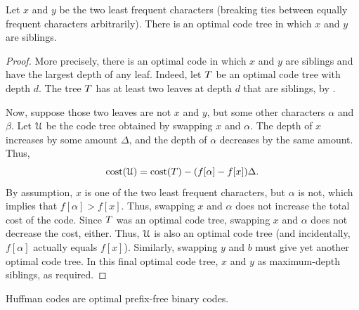 \begin{lemma}
    Let $x$ and $y$ be the two least frequent characters (breaking
    ties between equally frequent characters arbitrarily). There is an
    optimal code tree in which $x$ and $y$ are siblings.
\end{lemma}

\begin{proof}
    More precisely, there is an optimal code in which $x$ and $y$ are
    siblings and have the largest depth of any leaf.  Indeed, let
    $T$ be an optimal code tree with depth $d$. The tree $T$
    has at least two leaves at depth $d$ that are siblings, by
    .

    Now, suppose those two leaves are not $x$ and $y$, but some other
    characters $\alpha$ and $\beta$.  Let $\EuScript{U}$ be the code tree
    obtained by swapping $x$ and $\alpha$. The depth of $x$ increases
    by some amount $\Delta$, and the depth of $\alpha$ decreases by
    the same amount. Thus,
    \begin{equation*}
    \costX{\TreeA} = \costX{\Tree} - \pth{\MakeSBig f[\alpha ] - f[ x
       ]}\Delta.
    \end{equation*}
    By assumption, $x$ is one of the two least frequent characters,
    but $\alpha$ is not, which implies that $f[\alpha] > f[x]$. Thus,
    swapping $x$ and $\alpha$ does not increase the total cost of the
    code. Since $T$ was an optimal code tree, swapping $x$ and
    $\alpha$ does not decrease the cost, either. Thus, $\EuScript{U}$ is
    also an optimal code tree (and incidentally, $f[\alpha]$ actually
    equals $f[x]$).  Similarly, swapping $y$ and $b$ must give yet another
    optimal code tree. In this final optimal code tree, $x$ and $y$ as
    maximum-depth siblings, as required.
\end{proof}

\begin{theorem}
    Huffman codes are optimal prefix-free binary codes.
\end{theorem}

